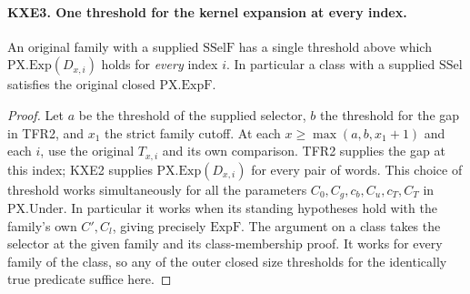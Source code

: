 \paragraph{KXE3. One threshold for the kernel expansion at every index.}
An original family with a supplied $\mathrm{SSelF}$ has a single
threshold above which $\mathrm{PX.Exp}(D_{x,i})$ holds for
\emph{every} index $i$. In particular a class with a supplied
$\mathrm{SSel}$ satisfies the original closed $\mathrm{PX.ExpF}$.
\begin{proof}
Let $a$ be the threshold of the supplied selector, $b$ the threshold
for the gap in TFR2, and $x_1$ the strict family cutoff. At each
$x\ge\max(a,b,x_1+1)$ and each $i$, use the original $T_{x,i}$
and its own comparison. TFR2 supplies the gap at this index;
KXE2 supplies $\mathrm{PX.Exp}(D_{x,i})$ for every pair of words.
This choice of threshold works simultaneously for all the parameters
$C_0,C_g,c_b,C_u,c_T,C_T$ in $\mathrm{PX.Under}$. In particular
it works when its standing hypotheses hold with the family's own
$C',C_l$, giving precisely $\mathrm{ExpF}$. The argument on a class
takes the selector at the given family and its class-membership proof.
It works for every family of the class, so any of the outer closed
size thresholds for the identically true predicate suffice here.
\end{proof}
